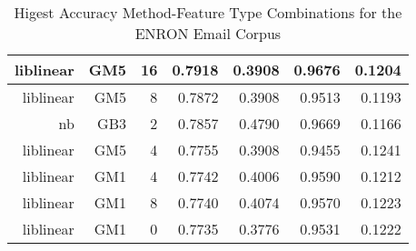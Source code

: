 \begin{center}
\begin{table}[h]
\begin{tabular}{ | r | r | r | r | r | r | r | }
			liblinear & GM5 & 16 & 0.7918 & 0.3908 & 0.9676 & 0.1204\\ \hline 
			liblinear & GM5 & 8 & 0.7872 & 0.3908 & 0.9513 & 0.1193\\ \hline 
			nb & GB3 & 2 & 0.7857 & 0.4790 & 0.9669 & 0.1166\\ \hline 
			liblinear & GM5 & 4 & 0.7755 & 0.3908 & 0.9455 & 0.1241\\ \hline 
			liblinear & GM1 & 4 & 0.7742 & 0.4006 & 0.9590 & 0.1212\\ \hline 
			liblinear & GM1 & 8 & 0.7740 & 0.4074 & 0.9570 & 0.1223\\ \hline 
			liblinear & GM1 & 0 & 0.7735 & 0.3776 & 0.9531 & 0.1222\\ \hline 

			\end{tabular}
		\caption{Higest Accuracy Method-Feature Type Combinations for the ENRON Email Corpus}
		\label{tab:enron-accuracy-filtered-ranked}
	\end{table}
	\end{center}

